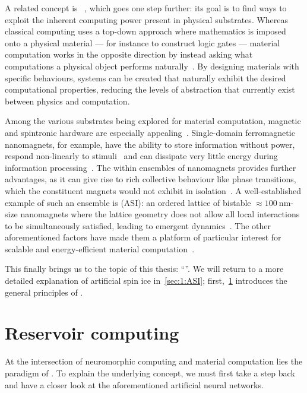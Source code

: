 A related concept is ~\cite{NeglectedPillar}, which goes one step further: its goal is to find ways to exploit the inherent computing power present in physical substrates.
Whereas classical computing uses a top-down approach where mathematics is imposed onto a physical material --- for instance to construct logic gates --- material computation works in the opposite direction by instead asking what computations a physical object performs naturally~\cite{RC_ASI}.
By designing materials with specific behaviours, systems can be created that naturally exhibit the desired computational properties, reducing the levels of abstraction that currently exist between physics and computation. \par
Among the various substrates being explored for material computation, magnetic and spintronic hardware are especially appealing~\cite{grollier2020neuromorphic,NeuromorphicSpintronicsProspect,QuantumNeuromorphicOpportunities}.
Single-domain ferromagnetic nanomagnets, for example, have the ability to store information without power, respond non-linearly to stimuli~\cite{NeuromorphicSpintronics} and can dissipate very little energy during information processing~\cite{ThermodynamicLimitsComputation,SpintronicsEnergyEfficientComputing}.
The  within ensembles of nanomagnets provides further advantages, as it can give rise to rich collective behaviour like phase transitions, which the constituent magnets would not exhibit in isolation~\cite{NeuromorphicSpintronicsProspect,RC_ASI}.
A well-established example of such an ensemble is  (ASI): an ordered lattice of bistable $\approx \SI{100}{\nano\metre}$-size nanomagnets where the lattice geometry does not allow all local interactions to be simultaneously satisfied, leading to emergent dynamics~\cite{ASIpyrochlores}.
The other aforementioned factors have made them a platform of particular interest for scalable and energy-efficient material computation~\cite{PhD_Stromberg}. \par
This finally brings us to the topic of this thesis: ``\emph{\phdtitle}''.
We will return to a more detailed explanation of artificial spin ice in~\cref{sec:1:ASI}; first,~\cref{sec:1:RC} introduces the general principles of .

\newpage
\section{Reservoir computing}\label{sec:1:RC}
At the intersection of neuromorphic computing and material computation lies the paradigm of .
To explain the underlying concept, we must first take a step back and have a closer look at the aforementioned artificial neural networks.

